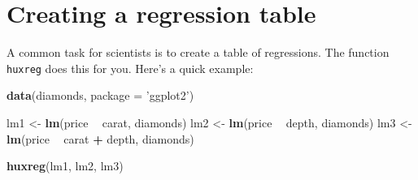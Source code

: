 \documentclass[]{article}
\newenvironment{Shaded}{\begin{snugshade}}{\end{snugshade}}
\newcommand{\KeywordTok}[1]{\textcolor[rgb]{0.13,0.29,0.53}{\textbf{#1}}}
\newcommand{\DataTypeTok}[1]{\textcolor[rgb]{0.13,0.29,0.53}{#1}}
\newcommand{\StringTok}[1]{\textcolor[rgb]{0.31,0.60,0.02}{#1}}
\newcommand{\OperatorTok}[1]{\textcolor[rgb]{0.81,0.36,0.00}{\textbf{#1}}}
\newcommand{\NormalTok}[1]{#1}
\begin{document}
\FloatBarrier

\section{Creating a regression table}\label{creating-a-regression-table}

A common task for scientists is to create a table of regressions. The
function \texttt{huxreg} does this for you. Here's a quick example:

\begin{Shaded}
\begin{Highlighting}[]
\KeywordTok{data}\NormalTok{(diamonds, }\DataTypeTok{package =} \StringTok{'ggplot2'}\NormalTok{)}

\NormalTok{lm1 <-}\StringTok{ }\KeywordTok{lm}\NormalTok{(price }\OperatorTok{~}\StringTok{ }\NormalTok{carat, diamonds)}
\NormalTok{lm2 <-}\StringTok{ }\KeywordTok{lm}\NormalTok{(price }\OperatorTok{~}\StringTok{ }\NormalTok{depth, diamonds)}
\NormalTok{lm3 <-}\StringTok{ }\KeywordTok{lm}\NormalTok{(price }\OperatorTok{~}\StringTok{ }\NormalTok{carat }\OperatorTok{+}\StringTok{ }\NormalTok{depth, diamonds)}

\KeywordTok{huxreg}\NormalTok{(lm1, lm2, lm3)}
\end{Highlighting}
\end{Shaded}
\end{document}
